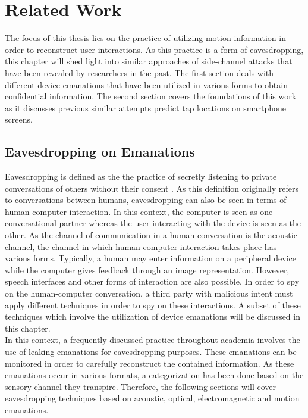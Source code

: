 \chapter{Related Work\label{cha:chapter2}}
The focus of this thesis lies on the practice of utilizing motion information in order to reconstruct user interactions. As this practice is a form of eavesdropping, this chapter will shed light into similar approaches of side-channel attacks that have been revealed by researchers in the past. The first section deals with different device emanations that have been utilized in various forms to obtain confidential information. The second section covers the foundations of this work as it discusses previous similar attempts predict tap locations on smartphone screens.

\section{Eavesdropping on Emanations}

Eavesdropping is defined as the the practice of secretly listening to private conversations of others without their consent \cite{black1990black}. As this definition originally refers to conversations between humans, eavesdropping can also be seen in terms of human-computer-interaction. In this context, the computer is seen as one conversational partner whereas the user interacting with the device is seen as the other. As the channel of communication in a human conversation is the acoustic channel, the channel in which human-computer interaction takes place has various forms. Typically, a human may enter information on a peripheral device while the computer gives feedback through an image representation. However, speech interfaces and other forms of interaction are also possible. In order to spy on the human-computer conversation, a third party with malicious intent must apply different techniques in order to spy on these interactions. A subset of these techniques which involve the utilization of device emanations will be discussed in this chapter.\\

In this context, a frequently discussed practice throughout academia involves the use of leaking emanations for eavesdropping purposes. These emanations can be monitored in order to carefully reconstruct the contained information. As these emanations occur in various formats, a categorization has been done based on the sensory channel they transpire. Therefore, the following sections will cover eavesdropping techniques based on acoustic, optical, electromagnetic and motion emanations.

